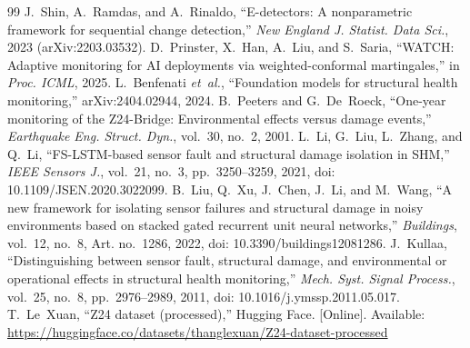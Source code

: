 \documentclass[conference]{IEEEtran}
\begin{document}
\begin{thebibliography}{99}
 J.~Shin, A.~Ramdas, and A.~Rinaldo, ``E-detectors: A nonparametric framework for sequential change detection,'' \emph{New England J. Statist. Data Sci.}, 2023 (arXiv:2203.03532).
 D.~Prinster, X.~Han, A.~Liu, and S.~Saria, ``WATCH: Adaptive monitoring for AI deployments via weighted-conformal martingales,'' in \emph{Proc. ICML}, 2025.
 L.~Benfenati \emph{et~al.}, ``Foundation models for structural health monitoring,'' arXiv:2404.02944, 2024.
 B.~Peeters and G.~De~Roeck, ``One-year monitoring of the Z24-Bridge: Environmental effects versus damage events,'' \emph{Earthquake Eng. Struct. Dyn.}, vol.~30, no.~2, 2001.
 L.~Li, G.~Liu, L.~Zhang, and Q.~Li, ``FS-LSTM-based sensor fault and structural damage isolation in SHM,'' \emph{IEEE Sensors J.}, vol.~21, no.~3, pp.~3250--3259, 2021, doi: 10.1109/JSEN.2020.3022099.
 B.~Liu, Q.~Xu, J.~Chen, J.~Li, and M.~Wang, ``A new framework for isolating sensor failures and structural damage in noisy environments based on stacked gated recurrent unit neural networks,'' \emph{Buildings}, vol.~12, no.~8, Art. no.~1286, 2022, doi: 10.3390/buildings12081286.
 J.~Kullaa, ``Distinguishing between sensor fault, structural damage, and environmental or operational effects in structural health monitoring,'' \emph{Mech. Syst. Signal Process.}, vol.~25, no.~8, pp.~2976--2989, 2011, doi: 10.1016/j.ymssp.2011.05.017.
 T.~Le~Xuan, ``Z24 dataset (processed),'' Hugging Face. [Online]. Available: \url{https://huggingface.co/datasets/thanglexuan/Z24-dataset-processed}
\end{thebibliography}
\end{document}
